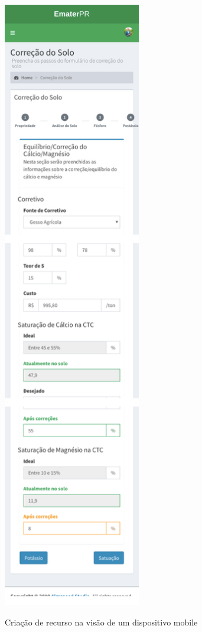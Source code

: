 \begin{figure}[H]
    \centering
    \caption{Criação de recurso na visão de um dispositivo mobile}
    \includegraphics[width=6cm]{./dados/figuras/prototipos/create_mobile.png}
    \label{fig:prototipo_create_mobile}
\end{figure}


